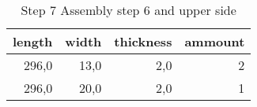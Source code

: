 \begin{table}[h!]
\centering
\caption{Step 7 Assembly step 6 and upper side}
\begin{tabular}{rrrr}
\toprule
 length &  width &  thickness &  ammount \\
\midrule
  296,0 &   13,0 &        2,0 &        2 \\
  296,0 &   20,0 &        2,0 &        1 \\
\bottomrule
\end{tabular}
\end{table}
